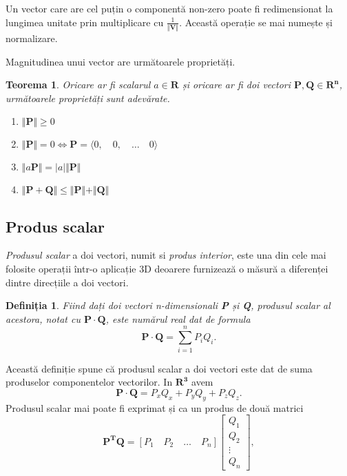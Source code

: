 \indent
Un vector care are cel puțin o componentă non-zero poate fi redimensionat la
lungimea unitate prin multiplicare cu $\frac{1}{\Vert \mathbf{V} \Vert}$.
Această operație se mai numește și normalizare.

\indent
Magnitudinea unui vector are următoarele proprietăți.
\newtheorem{mag_vectors}[vector_arith]{Teorema}
\begin{mag_vectors}
Oricare ar fi scalarul $\mathit{a} \in \mathbf{R}$ și oricare ar fi doi vectori
$\mathbf{P, Q} \in \mathbf{R^n}$, următoarele proprietăți sunt adevărate.
\begin{enumerate}
  \item $\Vert \mathbf{P} \Vert \geq 0$
  \item $\Vert \mathbf{P} \Vert = 0 \iff \mathbf{P} = \langle 0, \quad 0, \quad
  \dots \quad 0 \rangle$
  \item $\Vert \mathit{a}\mathbf{P} \Vert = \vert \mathit{a} \vert \Vert
  \mathbf{P} \Vert$
  \item $\Vert \mathbf{P + Q} \Vert \leq \Vert \mathbf{P} \Vert + \Vert
  \mathbf{Q} \Vert$
\end{enumerate}
\end{mag_vectors}

\newpage
\subsection{Produs scalar}
\label{ch1:sec_vectors:dot_product}
\indent

\textit{Produsul scalar} a doi vectori, numit si \textit{produs interior}, este
una din cele mai folosite operații într-o aplicație 3D deoarere furnizează o
măsură a diferenței dintre direcțiile a doi vectori.
\newtheorem{def_dotproduct}{Definiția}
\begin{def_dotproduct}
Fiind dați doi vectori \textit{n}-dimensionali \textbf{P} și \textbf{Q},
produsul scalar al acestora, notat cu $\mathbf{P} \cdot \mathbf{Q}$, este
numărul real dat de formula
\begin{equation}
\label{eq:vec:8}
\mathbf{P} \cdot \mathbf {Q} = \sum_{i = 1}^{n} P_iQ_i.
\end{equation}
\end{def_dotproduct}
Această definiție spune că produsul scalar a doi vectori este dat de suma
produselor componentelor vectorilor. In $\mathbf{R^3}$ avem
\begin{equation}
\label{eq:vec:9}
\mathbf{P \cdot Q} = P_xQ_x + P_yQ_y + P_zQ_z.
\end{equation}
Produsul scalar mai poate fi exprimat și ca un produs de două matrici
\begin{equation}
\label{eq:vec:10}
\mathbf{P^TQ} = [P_1 \quad P_2 \quad \dots \quad P_n]
\begin{bmatrix}
Q_1 \\
Q_2 \\
\vdots \\
Q_n
\end{bmatrix},
\end{equation}

